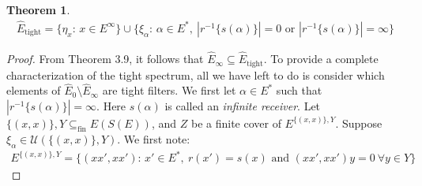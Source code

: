 \documentclass[12pt]{article}
\newtheorem{theorem}{Theorem}[section]
\theoremstyle{definition}
\begin{document}
\begin{theorem} 
    \begin{align*}
    \hat{E}_\text{tight} = \{\eta_x \text{: } x \in E^\infty\} \cup \{\xi_\alpha \text{: }\alpha \in E^*, \ |r^{-1}\{s(\alpha)\}| = 0 \text{ or } |r^{-1}\{s(\alpha)\}| = \infty\} 
    \end{align*}
\end{theorem}
\begin{proof}
    From Theorem 3.9, it follows that $\hat{E}_\infty \subseteq \hat{E}_\text{tight}$. To provide
    a complete characterization of the tight spectrum, all we have left to do is consider which
    elements of $\hat{E}_0 \setminus \hat{E}_\infty$ are tight filters. 
    We first let $\alpha \in E^*$ such that $|r^{-1}\{s(\alpha)\}| = \infty$. Here $s(\alpha)$ is called an \emph{infinite receiver}.
    Let $\{(x, x)\}, Y \subseteq_{\text{fin}} E(S(E))$, and $Z$ be a finite cover of $E^{\{(x, x)\}, Y}$.
    Suppose $\xi_\alpha \in \mathcal{U}(\{(x, x)\}, Y)$. We first note:
    \begin{align*}
        E^{\{(x, x)\}, Y} = \{ (xx', xx') \text{: } x' \in E^*, \ r(x') = s(x) \text{ and } (xx', xx')y = 0 \ \forall y \in Y \}
    \end{align*}


\end{proof}
\end{document}
